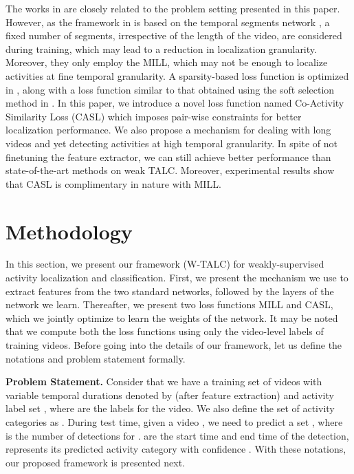 \documentclass[runningheads]{llncs}
\begin{document}
The works in \cite{wang2017untrimmednets,nguyen2017weakly} are closely related to the problem setting presented in this paper. However, as the framework in \cite{wang2017untrimmednets} is based on the temporal segments network \cite{wang2016temporal}, a fixed number of segments, irrespective of the length of the video, are considered during training, which may lead to a reduction in localization granularity. Moreover, they only employ the MILL, which may not be enough to localize activities at fine temporal granularity. A sparsity-based loss function is optimized in \cite{nguyen2017weakly}, along with a loss function similar to that obtained using the soft selection method in \cite{wang2017untrimmednets}. In this paper, we introduce a novel loss function named Co-Activity Similarity Loss (CASL) which imposes pair-wise constraints for better localization performance. We also propose a mechanism for dealing with long videos and yet detecting activities at high temporal granularity. In spite of not finetuning the feature extractor, we can still achieve better performance than state-of-the-art methods on weak TALC. Moreover, experimental results show that CASL is complimentary in nature with MILL. 

\section{Methodology}
In this section, we present our framework (W-TALC) for weakly-supervised activity localization and classification. First, we present the mechanism we use to extract features from the two standard networks, followed by the layers of the network we learn. Thereafter, we present two loss functions MILL and CASL, which we jointly optimize to learn the weights of the network. It may be noted that we compute both the loss functions using only the video-level labels of training videos. Before going into the details of our framework, let us define the notations and problem statement formally. 

\textbf{Problem Statement.} Consider that we have a training set of  videos  with variable temporal durations denoted by  (after feature extraction) and activity label set , where  are the  labels for the  video. We also define the set of activity categories as . During test time, given a video , we need to predict a set , where  is the number of detections for .  are the start time and end time of the  detection,  represents its predicted activity category with confidence . With these notations, our proposed framework is presented next. 
\end{document}

